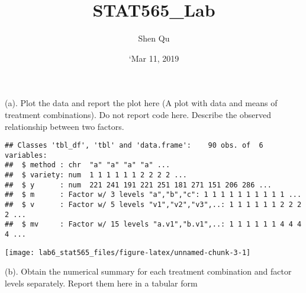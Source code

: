 \documentclass[]{article}
\title{STAT565\_Lab}
\author{Shen Qu}
\date{`Mar 11, 2019}
\begin{document}
\maketitle

(a).
\textcolor[rgb]{0.5,0.5,0.5}{Plot the data and report the plot here (A plot with data and means of treatment combinations). Do not report code here. Describe the observed relationship between two factors.}

\begin{verbatim}
## Classes 'tbl_df', 'tbl' and 'data.frame':    90 obs. of  6 variables:
##  $ method : chr  "a" "a" "a" "a" ...
##  $ variety: num  1 1 1 1 1 1 2 2 2 2 ...
##  $ y      : num  221 241 191 221 251 181 271 151 206 286 ...
##  $ m      : Factor w/ 3 levels "a","b","c": 1 1 1 1 1 1 1 1 1 1 ...
##  $ v      : Factor w/ 5 levels "v1","v2","v3",..: 1 1 1 1 1 1 2 2 2 2 ...
##  $ mv     : Factor w/ 15 levels "a.v1","b.v1",..: 1 1 1 1 1 1 4 4 4 4 ...
\end{verbatim}

\texttt{[image: lab6\_stat565\_files/figure-latex/unnamed-chunk-3-1]}

(b).
\textcolor[rgb]{0.5,0.5,0.5}{Obtain the numerical summary for each treatment combination and factor levels separately. Report them here in a tabular form}
\end{document}
